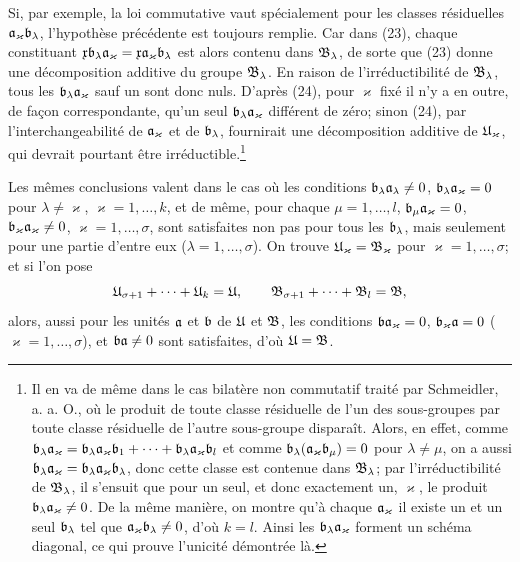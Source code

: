 Si, par exemple, la loi commutative vaut spécialement pour les classes résiduelles $\mathfrak{a}_\varkappa\mathfrak{b}_\lambda$, l'hypothèse précédente est toujours remplie. Car dans (23), chaque constituant $\mathfrak{x}\mathfrak{b}_\lambda\mathfrak{a}_\varkappa=\mathfrak{x}\mathfrak{a}_\varkappa\mathfrak{b}_\lambda$ est alors contenu dans $\mathfrak{B}_\lambda$, de sorte que (23) donne une décomposition additive du groupe $\mathfrak{B}_\lambda$. En raison de l'irréductibilité de $\mathfrak{B}_\lambda$, tous les $\mathfrak{b}_\lambda\mathfrak{a}_\varkappa$ sauf un sont donc nuls. D'après (24), pour $\varkappa$ fixé il n'y a en outre, de façon correspondante, qu'un seul $\mathfrak{b}_\lambda\mathfrak{a}_\varkappa$ différent de zéro; sinon (24), par l'interchangeabilité de $\mathfrak{a}_\varkappa$ et de $\mathfrak{b}_\lambda$, fournirait une décomposition additive de $\mathfrak{U}_\varkappa$, qui devrait pourtant être irréductible.\footnote{Il en va de même dans le cas bilatère non commutatif traité par Schmeidler, a. a. O., où le produit de toute classe résiduelle de l'un des sous-groupes par toute classe résiduelle de l'autre sous-groupe disparaît. Alors, en effet, comme $\mathfrak{b}_\lambda\mathfrak{a}_\varkappa=\mathfrak{b}_\lambda\mathfrak{a}_\varkappa\mathfrak{b}_1+\cdots+\mathfrak{b}_\lambda\mathfrak{a}_\varkappa\mathfrak{b}_l$ et comme $\mathfrak{b}_\lambda(\mathfrak{a}_\varkappa\mathfrak{b}_\mu)=0$ pour $\lambda\ne\mu$, on a aussi $\mathfrak{b}_\lambda\mathfrak{a}_\varkappa=\mathfrak{b}_\lambda\mathfrak{a}_\varkappa\mathfrak{b}_\lambda$, donc cette classe est contenue dans $\mathfrak{B}_\lambda$; par l'irréductibilité de $\mathfrak{B}_\lambda$, il s'ensuit que pour un seul, et donc exactement un, $\varkappa$, le produit $\mathfrak{b}_\lambda\mathfrak{a}_\varkappa\ne0$. De la même manière, on montre qu'à chaque $\mathfrak{a}_\varkappa$ il existe un et un seul $\mathfrak{b}_\lambda$ tel que $\mathfrak{a}_\varkappa\mathfrak{b}_\lambda\ne0$, d'où $k=l$. Ainsi les $\mathfrak{b}_\lambda\mathfrak{a}_\varkappa$ forment un schéma diagonal, ce qui prouve l'unicité démontrée là.}

Les mêmes conclusions valent dans le cas où les conditions $\mathfrak{b}_\lambda\mathfrak{a}_\lambda\ne0$, $\mathfrak{b}_\lambda\mathfrak{a}_\varkappa=0$ pour $\lambda\ne\varkappa$, $\varkappa=1,\ldots,k$, et de même, pour chaque $\mu=1,\ldots,l$, $\mathfrak{b}_\mu\mathfrak{a}_\varkappa=0$, $\mathfrak{b}_\varkappa\mathfrak{a}_\varkappa\ne0$, $\varkappa=1,\ldots,\sigma$, sont satisfaites non pas pour tous les $\mathfrak{b}_\lambda$, mais seulement pour une partie d'entre eux ($\lambda=1,\ldots,\sigma$). On trouve $\mathfrak{U}_\varkappa=\mathfrak{B}_\varkappa$ pour $\varkappa=1,\ldots,\sigma$; et si l'on pose
\[
 \mathfrak{U}_{\sigma+1}+\cdots+\mathfrak{U}_k=\mathfrak{U},
 \qquad
 \mathfrak{B}_{\sigma+1}+\cdots+\mathfrak{B}_l=\mathfrak{B},
\]
alors, aussi pour les unités $\mathfrak{a}$ et $\mathfrak{b}$ de $\mathfrak{U}$ et $\mathfrak{B}$, les conditions $\mathfrak{b}\mathfrak{a}_\varkappa=0$, $\mathfrak{b}_\varkappa\mathfrak{a}=0$ ($\varkappa=1,\ldots,\sigma$), et $\mathfrak{b}\mathfrak{a}\ne0$ sont satisfaites, d'où $\mathfrak{U}=\mathfrak{B}$.
